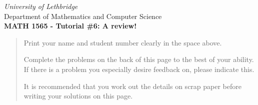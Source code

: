 \documentclass[12pt]{article}
\newcommand{\skipline}{\vspace{12pt}}
\begin{document}
\author{Instructor: Sean Fitzpatrick}
\thispagestyle{empty}
\begin{center}
\emph{University of Lethbridge}\\
Department of Mathematics and Computer Science\\
{\bf MATH 1565 - Tutorial \#6: A review!}\\
\end{center}



\vspace{0.1in}

\vspace*{\fill}

\begin{quote}
Print your name and student number clearly in the space above. 

\medskip

Complete the problems on the back of this page to the best of your ability. If there is a problem you especially desire feedback on, please indicate this. 

\medskip

It is recommended that you work out the details on scrap paper before writing your solutions on this page.
\end{quote}
\newpage
\end{document}
